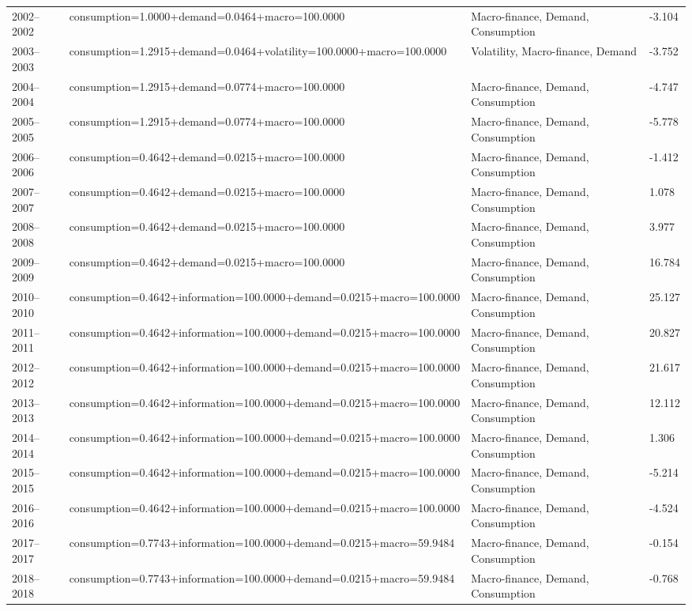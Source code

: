 \begin{table}[H]
\begin{tabular}{llll}
2002--2002  & consumption=1.0000+demand=0.0464+macro=100.0000 & Macro-finance, Demand, Consumption & -3.104 \\
2003--2003  & consumption=1.2915+demand=0.0464+volatility=100.0000+macro=100.0000 & Volatility, Macro-finance, Demand & -3.752 \\
2004--2004  & consumption=1.2915+demand=0.0774+macro=100.0000 & Macro-finance, Demand, Consumption & -4.747 \\
2005--2005  & consumption=1.2915+demand=0.0774+macro=100.0000 & Macro-finance, Demand, Consumption & -5.778 \\
2006--2006  & consumption=0.4642+demand=0.0215+macro=100.0000 & Macro-finance, Demand, Consumption & -1.412 \\
2007--2007  & consumption=0.4642+demand=0.0215+macro=100.0000 & Macro-finance, Demand, Consumption & 1.078 \\
2008--2008  & consumption=0.4642+demand=0.0215+macro=100.0000 & Macro-finance, Demand, Consumption & 3.977 \\
2009--2009  & consumption=0.4642+demand=0.0215+macro=100.0000 & Macro-finance, Demand, Consumption & 16.784 \\
2010--2010  & consumption=0.4642+information=100.0000+demand=0.0215+macro=100.0000 & Macro-finance, Demand, Consumption & 25.127 \\
2011--2011  & consumption=0.4642+information=100.0000+demand=0.0215+macro=100.0000 & Macro-finance, Demand, Consumption & 20.827 \\
2012--2012  & consumption=0.4642+information=100.0000+demand=0.0215+macro=100.0000 & Macro-finance, Demand, Consumption & 21.617 \\
2013--2013  & consumption=0.4642+information=100.0000+demand=0.0215+macro=100.0000 & Macro-finance, Demand, Consumption & 12.112 \\
2014--2014  & consumption=0.4642+information=100.0000+demand=0.0215+macro=100.0000 & Macro-finance, Demand, Consumption & 1.306 \\
2015--2015  & consumption=0.4642+information=100.0000+demand=0.0215+macro=100.0000 & Macro-finance, Demand, Consumption & -5.214 \\
2016--2016  & consumption=0.4642+information=100.0000+demand=0.0215+macro=100.0000 & Macro-finance, Demand, Consumption & -4.524 \\
2017--2017  & consumption=0.7743+information=100.0000+demand=0.0215+macro=59.9484 & Macro-finance, Demand, Consumption & -0.154 \\
2018--2018  & consumption=0.7743+information=100.0000+demand=0.0215+macro=59.9484 & Macro-finance, Demand, Consumption & -0.768 \\

\end{tabular}
\end{table}
